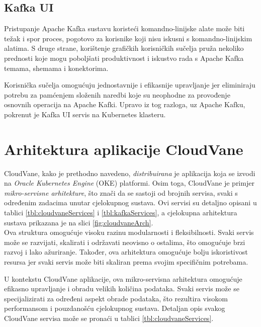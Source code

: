 \documentclass[times, utf8, diplomski]{fer}
\begin{document}
\subsection{Kafka UI}
\label{sec:kafka-ui}

Pristupanje Apache Kafka sustavu koristeći komandno-linijske alate  može biti težak i spor proces, pogotovo za korisnike koji nisu iskusni s komandno-linijskim alatima. S druge strane, korištenje grafičkih korisničkih sučelja  pruža nekoliko prednosti koje mogu poboljšati produktivnost i iskustvo rada s Apache Kafka temama, shemama i konektorima.

Korisnička sučelja omogućuju jednostavnije i efikasnije upravljanje jer eliminiraju potrebu za pamćenjem složenih naredbi koje su neophodne za provođenje osnovnih operacija na Apache Kafki. Upravo iz tog razloga, uz Apache Kafku, pokrenut je Kafka UI servis na Kubernetes klasteru.

\section{Arhitektura aplikacije CloudVane}
\label{sec:architecture}

CloudVane, kako je prethodno navedeno, \emph{distribuirana} je aplikacija koja se izvodi na \emph{Oracle Kubernetes Engine} (OKE) platformi. Osim toga, CloudVane je primjer \emph{mikro-servisne arhitekture}, što znači da se sastoji od brojnih servisa, svaki s određenim zadacima unutar cjelokupnog sustava. Ovi servisi su detaljno opisani u tablici \ref{tbl:cloudvaneServices} i \ref{tbl:kafkaServices}, a cjelokupna arhitektura sustava prikazana je na slici \ref{fig:cloudvaneArch}.\\

Ova struktura omogućuje visoku razinu modularnosti i fleksibilnosti. Svaki servis može se razvijati, skalirati i održavati neovisno o ostalima, što omogućuje brzi razvoj i lako ažuriranje. Također, ova arhitektura omogućuje bolju iskoristivost resursa jer svaki servis može biti skaliran prema svojim specifičnim potrebama.

U kontekstu CloudVane aplikacije, ova mikro-servisna arhitektura omogućuje efikasno upravljanje i obradu velikih količina podataka. Svaki servis može se specijalizirati za određeni aspekt obrade podataka, što rezultira visokom performansom i pouzdanošću cjelokupnog sustava. Detaljan opis svakog CloudVane servisa može se pronaći u tablici \ref{tbl:cloudvaneServices}.
\end{document}
